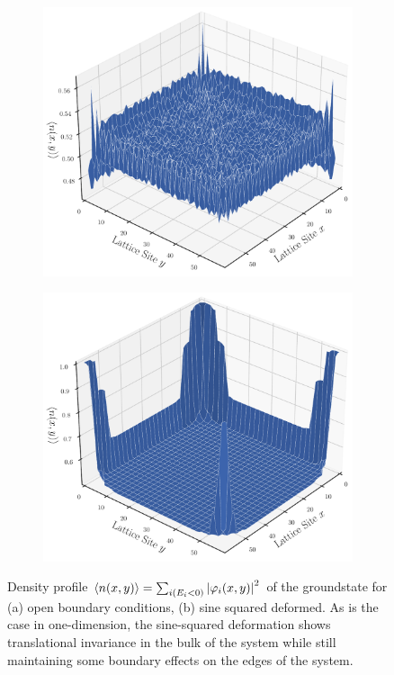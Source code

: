 \documentclass[11pt, a4paper, oneside]{book}
\theoremstyle{definition} %
\begin{document}
\begin{appendices}
\begin{figure}
\centering
		\begin{subfigure}[b]{0.45\textwidth}
			\includegraphics[width=\textwidth]{DensityprofileOBC}
			\caption{}
		\end{subfigure}
		\begin{subfigure}[b]{0.45\textwidth}
			\includegraphics[width=\textwidth]{DensityprofileSSD}
			\caption{}
		\end{subfigure}
		\caption{Density profile $\expval{n(x,y)} = \sum_{i (E_i < 0)} \abs{\varphi_{i}(x,y)}^2$ of the groundstate for (a) open boundary conditions, (b) sine squared deformed. As is the case in one-dimension, the sine-squared deformation shows translational invariance in the bulk of the system while still maintaining some boundary effects on the edges of the system.}
\end{figure}
\end{appendices}
\end{document}
